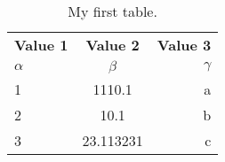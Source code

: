 \documentclass{article}
\begin{document}
	\begin{table}
		\begin{center}
			\caption{My first table.}
			\label{tab:table1}
			\begin{tabular}{l|c|r}%
				\textbf{Value 1} & \textbf{Value 2} & \textbf{Value 3}\\
				$\alpha$ & $\beta$ & $\gamma$ \\
				\hline
				1 & 1110.1 & a\\
				2 & 10.1 & b\\
				3 & 23.113231 & c\\
			\end{tabular}
		\end{center}
	\end{table}
\end{document}
